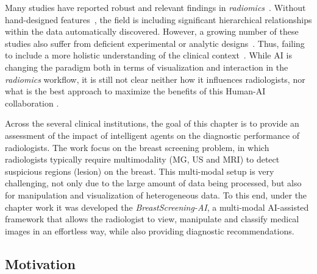 Many studies have reported robust and relevant findings in {\it radiomics}~\cite{aerts2017data}.
Without hand-designed features~\cite{ker2018deep}, the field is including significant hierarchical relationships within the data automatically discovered.
However, a growing number of these studies also suffer from deficient experimental or analytic designs~\cite{aerts2017data}.
Thus, failing to include a more holistic understanding of the clinical context~\cite{Sultanum:2018:MTP:3173574.3173996}.
While \ac{AI} is changing the paradigm both in terms of visualization and interaction in the {\it radiomics} workflow, it is still not clear neither how it influences radiologists, nor what is the best approach to maximize the benefits of this Human-\ac{AI} collaboration \cite{Kocielnik:2019:YAI:3290605.3300641}.

Across the several clinical institutions\footnotemark[20], the goal of this chapter is to provide an assessment of the impact of intelligent agents on the diagnostic performance of radiologists.
The work focus on the breast screening problem, in which radiologists typically require multimodality (\ac{MG}, \ac{US} and \ac{MRI}) to detect suspicious regions (lesion) on the breast.
This multi-modal setup is very challenging, not only due to the large amount of data being processed, but also for manipulation and visualization of heterogeneous data.
To this end, under the chapter work it was developed the {\it BreastScreening-AI}, a multi-modal \ac{AI}-assisted framework  that allows the radiologist to view, manipulate and classify medical images in an effortless way, while also providing diagnostic recommendations.


\subsection{Motivation}
\label{sec:chap005001001}

